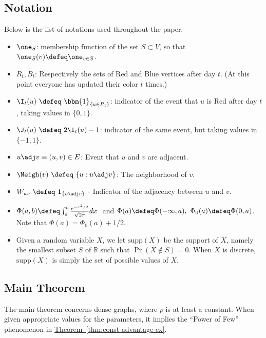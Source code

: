\documentclass[11pt]{article}
\numberwithin{equation}{section}
\theoremstyle{definition}
\theoremstyle{plain}
\newcommand{\eee}{\mathrm e}
\newcommand{\expref}[2]{\hyperref[#2]{#1~\ref{#2}}}
\begin{document}
			
			\subsection {Notation}
			
			Below is the list of notations used throughout the paper.
			
			\begin{itemize}
				\item $\one_S$: membership function of the set $S\subset V$, so that $\one_S(v) \defeq \one_{v\in S}$.
				\item $R_t, B_t$: Respectively the sets of Red and Blue vertices after day $t$.
				(At this point everyone has updated their color $t$ times.)
				\item $\I_t(u) \ \defeq \ \bbm{1}_{\{u\in R_t\}}$: indicator of the event that $u$ is Red after day $t$, taking values in $\{0, 1\}$.
				\item $\J_t(u) \ \defeq \ 2\I_t(u) - 1$: indicator of the same event, but taking values in $\{-1, 1\}$.
				\item $u\adj v \equiv (u, v)\in E$: Event that $u$ and $v$ are adjacent.
				\item $\Neigh(v) \ \defeq \ \{u: u\adj v\}$: The neighborhood of $v$.
				\item $W_{uv} \ \defeq \ \mathbf{1}_{\{u\adj v\}}$ - Indicator of the adjacency between $u$ and $v$. %
				\item $\Phi(a, b) \defeq \int_a^b \frac{\eee^{-x^2/2}}{\sqrt{2\pi}}dx~$ and $\Phi(a) \defeq \Phi(-\infty, a), \ \Phi_0(a) \defeq \Phi(0, a)$.
				Note that $\Phi(a) = \Phi_0(a) + 1/2$.
				\item Given a random variable $X$, we let $\text{supp}(X)$ be the support of $X$, namely the smallest subset $S$ of $\mathbb{R}$ such that $\Pr(X\notin S) = 0$.
				When $X$ is discrete, $\text{supp}(X)$ is simply the set of possible values of $X$.
			\end{itemize}
			
			
			\subsection{Main Theorem} \label{subsec:main-theorem}
			
			The main theorem concerns dense graphs, where $p$ is at least a constant.  When given appropriate values for the parameters, it implies the ``Power of Few'' phenomenon in \expref{Theorem}{thm:const-advantage-ex}.
			
\end{document}
